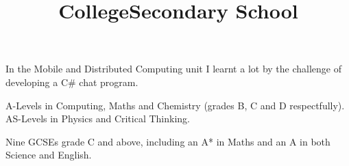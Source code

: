 \documentclass[line,margin]{res}
\newcommand{\ampersand}{\&}
\newcommand{\CSharp}{C\#}
\begin{document}
\begin{resume}
\begin{position}
In the Mobile and Distributed Computing unit I learnt a lot by the challenge of developing a {\CSharp} chat program.
\end{position}

\title{College}
\begin{position}
A-Levels in Computing, Maths and Chemistry (grades B, C and D respectfully). \\
AS-Levels in Physics and Critical Thinking.

\begin{comment}
\begin{tabular}{ l r r }
	Computing & A Level & B \\
	Maths & A Level & C \\
	Chemistry & A Level & D \\
	Physics & AS Level & D \\
	Critical Thinking & AS Level & E \\
\end{tabular}
\end{comment}
\end{position}

\title{Secondary School}
\begin{position}
Nine GCSEs grade C and above, including an A* in Maths and an A in both Science and English.

\begin{comment}
\begin{tabular}{ l r r }
	Mathematics & (a year early) GCSE & A* \\
	Science & Double Award GCSE & AA \\
	English & GCSE & A \\
	History & GCSE & B \\
	Systems {\ampersand} Control & GCSE & B \\
	ICT & Short Course GCSE & C \\
	Statistics & GCSE & C \\
	English Literature & GCSE & C \\
	Geography & GCSE & D \\
	Drama & GCSE & F \\
\end{tabular}
\end{comment}
\end{position}


\end{resume}
\end{document}

